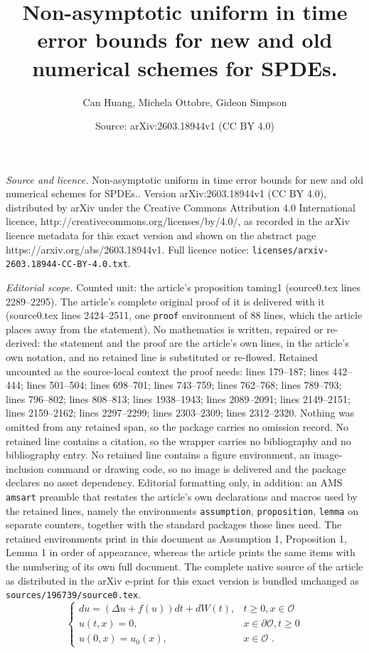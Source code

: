 \documentclass[10pt,a4paper]{amsart}
\title{Non-asymptotic uniform in time error bounds for new and old numerical schemes for SPDEs.}
\author{Can Huang, Michela Ottobre, Gideon Simpson}
\date{Source: arXiv:2603.18944v1 (CC BY 4.0)}
\begin{document}
\maketitle

\noindent\emph{Source and licence.} Non-asymptotic uniform in time error bounds for new and old numerical schemes for SPDEs.. Version arXiv:2603.18944v1 (CC BY 4.0), distributed by arXiv under the Creative Commons Attribution 4.0 International licence, http://creativecommons.org/licenses/by/4.0/, as recorded in the arXiv licence metadata for this exact version and shown on the abstract page https://arxiv.org/abs/2603.18944v1. Full licence notice: \texttt{licenses/arxiv-2603.18944-CC-BY-4.0.txt}.\par\smallskip

\noindent\textit{Editorial scope.} Counted unit: the article's proposition taming1 (source0.tex lines 2289--2295). The article's complete original proof of it is delivered with it (source0.tex lines 2424--2511, one \texttt{proof} environment of 88 lines, which the article places away from the statement). No mathematics is written, repaired or re-derived: the statement and the proof are the article's own lines, in the article's own notation, and no retained line is substituted or re-flowed.  Retained uncounted as the source-local context the proof needs: lines 179--187; lines 442--444; lines 501--504; lines 698--701; lines 743--759; lines 762--768; lines 789--793; lines 796--802; lines 808--813; lines 1938--1943; lines 2089--2091; lines 2149--2151; lines 2159--2162; lines 2297--2299; lines 2303--2309; lines 2312--2320.  Nothing was omitted from any retained span, so the package carries no omission record.  No retained line contains a citation, so the wrapper carries no bibliography and no bibliography entry.  No retained line contains a figure environment, an image-inclusion command or drawing code, so no image is delivered and the package declares no asset dependency.  Editorial formatting only, in addition: an AMS \texttt{amsart} preamble that restates the article's own declarations and macros used by the retained lines, namely the environments \texttt{assumption}, \texttt{proposition}, \texttt{lemma} on separate counters, together with the standard packages those lines need.  The retained environments print in this document as Assumption 1, Proposition 1, Lemma 1 in order of appearance, whereas the article prints the same items with the numbering of its own full document.  The complete native source of the article as distributed in the arXiv e-print for this exact version is bundled unchanged as \texttt{sources/196739/source0.tex}.
\begin{equation}\label{eqn:SPDEintro}
\left\{
\begin{array}{ll}
du= \left(\Delta u  + f(u)\right) dt+  dW(t), & t\geq 0, x\in \mathcal O\\
u(t,x)=0, & x \in \partial \mathcal O, t\geq 0\\
u(0,x)= u_0(x), & x \in \mathcal O\, \,.
\end{array}
\right.
\end{equation}
\end{document}
